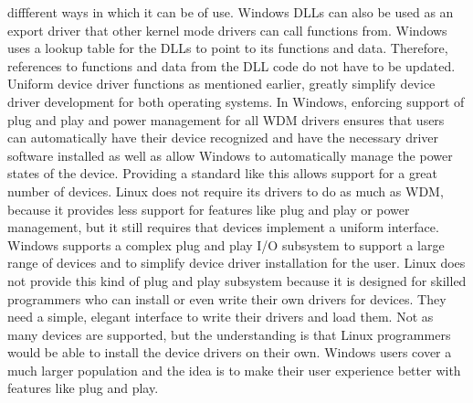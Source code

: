 \documentclass[letterpaper,10pt,titlepage]{article}
\begin{document}
diffferent ways in which it can be of use. Windows DLLs can also be used 
as an export driver that other kernel mode drivers can call functions from.
Windows uses a lookup table for the DLLs to point to its functions and data.
Therefore, references to functions and data from the DLL code do not have
to be updated. 
\\
\linebreak
Uniform device driver functions as mentioned earlier, greatly simplify 
device driver development for both operating systems. In Windows, enforcing
support of plug and play and power management for all WDM drivers ensures 
that users can automatically have their device recognized and have the 
necessary driver software installed as well as allow Windows to 
automatically manage the power states of the device. Providing a standard 
like this allows support for a great number of devices. Linux does not
require its drivers to do as much as WDM, because it provides less support for
features like plug and play or power management, but it still requires 
that devices implement a uniform interface.
\\
\linebreak
Windows supports a complex plug and play I/O subsystem to support a large 
range of devices and to simplify device driver installation for the user. 
Linux does not provide this kind of plug and play subsystem because it is 
designed for skilled programmers who can install or even write their own 
drivers for devices. They need a simple, elegant interface to write their 
drivers and load them. Not as many devices are supported, but the understanding
is that Linux programmers would be able to install the device drivers on their
own. Windows users cover a much larger population and the idea is to make
their user experience better with features like plug and play.

%
\nocite{*}
\RaggedRight


\end{document}
